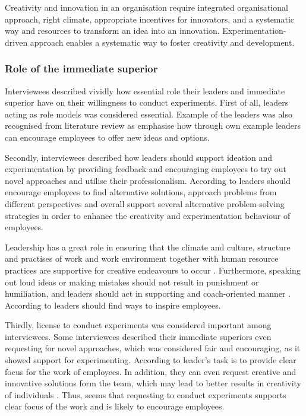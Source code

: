 Creativity and innovation in an organisation require integrated organisational approach, right climate, appropriate incentives for innovators, and a systematic way and resources to transform an idea into an innovation. \citep{roffe1999innovation} Experimentation-driven approach enables a systematic way to foster creativity and development. 

\subsubsection*{Role of the immediate superior}
Interviewees described vividly how essential role their leaders and immediate superior have on their willingness to conduct experiments. First of all, leaders acting as role models was considered essential. Example of the leaders was also recognised from literature review as \citet{garvin2008yours} emphasise how through own example leaders can encourage employees to offer new ideas and options. 

Secondly, interviewees described how leaders should support ideation and experimentation by providing feedback and encouraging employees to try out novel approaches and utilise their professionalism. According to \citep{redmond1993putting} leaders should encourage employees to find alternative solutions, approach problems from different perspectives and overall support several alternative problem-solving strategies in order to enhance the creativity and experimentation behaviour of employees. 

Leadership has a great role in ensuring that the climate and culture, structure and practises of work and work environment together with human resource practices are supportive for creative endeavours to occur \citep{shalley2004leaders,oldham1996employee,mumford2002leading}. Furthermore, speaking out loud ideas or making mistakes should not result in punishment or humiliation, and leaders should act in supporting and coach-oriented manner \citep{edmondson1999psychological}. According to \citet{sosik1999leadership} leaders should find ways to inspire employees. 

Thirdly, license to conduct experiments was considered important among interviewees.  Some interviewees described their immediate superiors even requesting for novel approaches, which was considered fair and encouraging, as it showed support for experimenting. According to \citet{barczak1989leadership} leader's task is to provide clear focus for the work of employees. In addition, they can even request creative and innovative solutions form the team, which may lead to better results in creativity of individuals \citep{amabile2002creativity}. Thus, seems that requesting to conduct experiments supports clear focus of the work and is likely to encourage employees.

